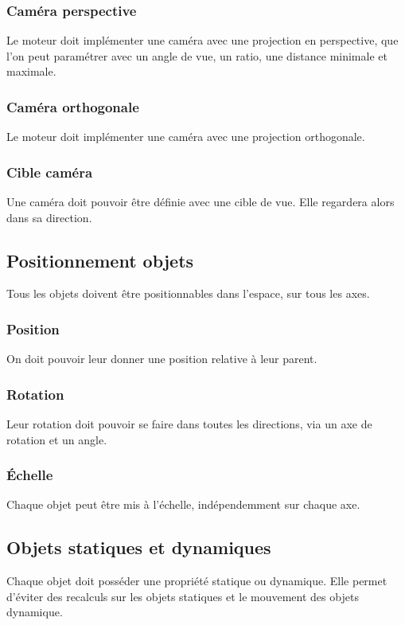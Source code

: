 \documentclass [a4 paper,11pt]{article}
\begin{document}
\subsubsection*{Caméra perspective}
Le moteur doit implémenter une caméra avec une projection en perspective, que l'on peut paramétrer avec un angle de vue,
un ratio, une distance minimale et maximale.

\subsubsection*{Caméra orthogonale}
Le moteur doit implémenter une caméra avec une projection orthogonale.

\subsubsection*{Cible caméra}
Une caméra doit pouvoir être définie avec une cible de vue.
Elle regardera alors dans sa direction.

\subsection{Positionnement objets}
Tous les objets doivent être positionnables dans l'espace, sur tous les axes.

\subsubsection*{Position}
On doit pouvoir leur donner une position relative à leur parent.

\subsubsection*{Rotation}
Leur rotation doit pouvoir se faire dans toutes les directions, via un axe de rotation et un angle.

\subsubsection*{Échelle}
Chaque objet peut être mis à l'échelle, indépendemment sur chaque axe.

\subsection{Objets statiques et dynamiques}
Chaque objet doit posséder une propriété statique ou dynamique.
Elle permet d'éviter des recalculs sur les objets statiques et le mouvement des objets dynamique.
\end{document}
